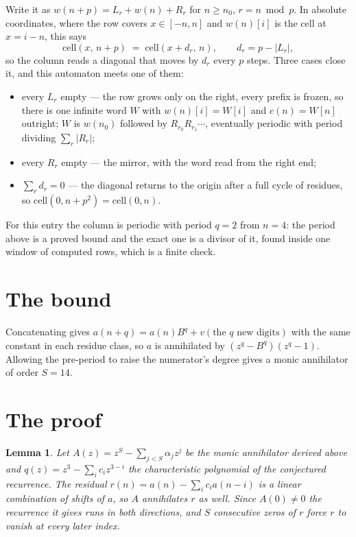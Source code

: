 \documentclass[11pt,a4paper]{article}
\theoremstyle{plain}
\newtheorem{lemma}[theorem]{Lemma}
\theoremstyle{definition}
\begin{document}
Write it as $w(n+p)=L_r+w(n)+R_r$ for $n\ge n_0$, $r=n \bmod p$. In absolute coordinates, where
the row covers $x\in[-n,n]$ and $w(n)[i]$ is the cell at $x=i-n$, this says
\[
\mathrm{cell}(x,\,n+p)\;=\;\mathrm{cell}(x+d_r,\,n),\qquad d_r=p-|L_r| ,
\]
so the column reads a diagonal that moves by $d_r$ every $p$ steps. Three cases close it, and
this automaton meets one of them:

\begin{itemize}
\item every $L_r$ empty --- the row grows only on the right, every prefix is frozen, so there
is one infinite word $W$ with $w(n)[i]=W[i]$ and $c(n)=W[n]$ outright; $W$ is $w(n_0)$ followed
by $R_{r_0}R_{r_1}\cdots$, eventually periodic with period dividing $\sum_r|R_r|$;
\item every $R_r$ empty --- the mirror, with the word read from the right end;
\item $\sum_r d_r=0$ --- the diagonal returns to the origin after a full cycle of residues, so
$\mathrm{cell}(0,n+p^2)=\mathrm{cell}(0,n)$.
\end{itemize}

For this entry the column is periodic with period $q=2$ from $n=4$: the period above is a
proved bound and the exact one is a divisor of it, found inside one window of computed rows,
which is a finite check.

\section{The bound}

Concatenating gives $a(n+q)=a(n)B^{q}+v(\text{the }q\text{ new digits})$ with the same constant in each residue class, so $a$ is annihilated by $(z^{q}-B^{q})(z^{q}-1)$.
Allowing the pre-period to raise the numerator's degree gives a monic annihilator of order
$S=14$.

\section{The proof}

\begin{lemma}\label{lem:crit}
Let $A(z)=z^S-\sum_{j<S}\alpha_jz^{j}$ be the monic annihilator derived above and
$q(z)=z^{3}-\sum_ic_iz^{3-i}$ the characteristic polynomial of the conjectured
recurrence. The residual $r(n)=a(n)-\sum_ic_ia(n-i)$ is a linear combination of shifts of $a$,
so $A$ annihilates $r$ as well. Since $A(0)\ne0$ the recurrence it gives runs in both
directions, and $S$ consecutive zeros of $r$ force $r$ to vanish at every later index.
\end{lemma}
\end{document}
